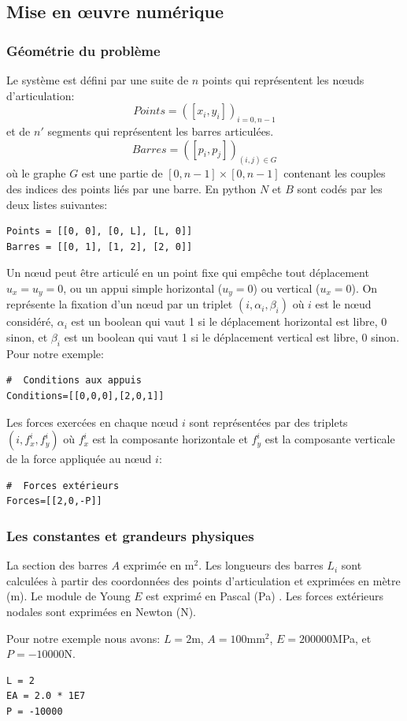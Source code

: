 \documentclass[a4paper]{article}
\begin{document}
\subsection{Mise en œuvre numérique}
\subsubsection{Géométrie du problème}
Le système est défini par une suite de $n$ points qui représentent les nœuds d'articulation:
\[Points=\left([x_i,y_i]\right)_{i=0,n-1}\]
et de $n'$ segments qui représentent les barres articulées.
\[Barres=\left([p_i,p_j]\right)_{(i,j)\in G}\]
où le graphe $G$ est une partie de $[0,n-1]\times [0,n-1]$ contenant les couples des indices des points liés par une barre. En python $N$ et $B$ sont codés par les deux listes suivantes:
\begin{verbatim}
Points = [[0, 0], [0, L], [L, 0]]
Barres = [[0, 1], [1, 2], [2, 0]]
\end{verbatim}
Un nœud peut être articulé en un point fixe qui empêche tout déplacement  $u_x=u_y=0$, ou un appui simple horizontal ($u_y=0$) ou vertical ($u_x=0$). On représente la fixation d'un nœud par un triplet $\left(i,\alpha_i,\beta_i\right)$ où  $i$  est le nœud considéré,  $\alpha_i$ est un boolean qui vaut 1 si le déplacement horizontal est libre, 0 sinon, et $\beta_i$ est un boolean qui vaut 1 si le déplacement vertical est libre, 0 sinon. Pour notre exemple:
\begin{verbatim}
#  Conditions aux appuis
Conditions=[[0,0,0],[2,0,1]]
\end{verbatim}
Les forces exercées en chaque nœud  $i$ sont représentées par des triplets $(i,f_{x}^i,f_y^i)$ où $f_x^i$ est la composante horizontale et $f_y^i$ est la composante verticale de la force appliquée au nœud $i$:
\begin{verbatim}
#  Forces extérieurs
Forces=[[2,0,-P]]
\end{verbatim}
\subsubsection{Les constantes et grandeurs physiques}
La section des barres $A$ exprimée en $\mbox{m}^2$. Les longueurs des barres $L_i$ sont calculées à partir des coordonnées des points d'articulation et exprimées en mètre (m). Le module de Young $E$ est exprimé en Pascal (Pa) . Les forces extérieurs nodales sont exprimées en Newton (N).

Pour notre exemple nous avons:
$L=2$m, $A=100\mbox{mm}^2$, $E=200000$MPa, et $P=-10000$N.
\begin{verbatim}
L = 2
EA = 2.0 * 1E7
P = -10000
\end{verbatim}
\end{document}
